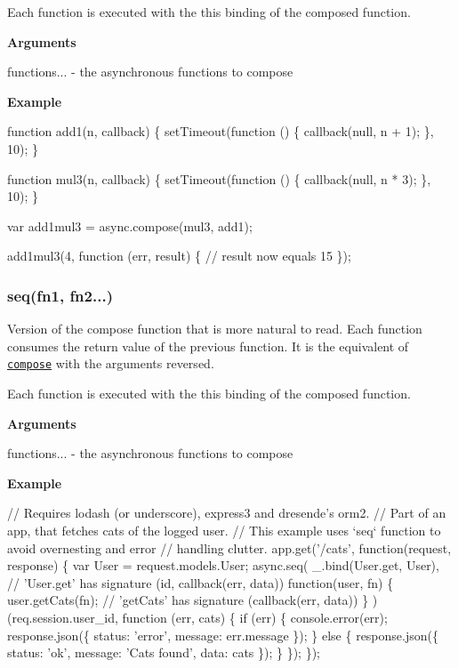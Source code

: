 Each function is executed with the {\ttfamily this} binding of the composed function.

{\bfseries Arguments}


\begin{DoxyItemize}
\item {\ttfamily functions...} -\/ the asynchronous functions to compose
\end{DoxyItemize}

{\bfseries Example}


\begin{DoxyCode}
function add1(n, callback) \{
    setTimeout(function () \{
        callback(null, n + 1);
    \}, 10);
\}

function mul3(n, callback) \{
    setTimeout(function () \{
        callback(null, n * 3);
    \}, 10);
\}

var add1mul3 = async.compose(mul3, add1);

add1mul3(4, function (err, result) \{
   // result now equals 15
\});
\end{DoxyCode}
 

 \label{_seq}%
 \subsubsection*{seq(fn1, fn2...)}

Version of the compose function that is more natural to read. Each function consumes the return value of the previous function. It is the equivalent of \href{#compose}{\tt {\ttfamily compose}} with the arguments reversed.

Each function is executed with the {\ttfamily this} binding of the composed function.

{\bfseries Arguments}


\begin{DoxyItemize}
\item {\ttfamily functions...} -\/ the asynchronous functions to compose
\end{DoxyItemize}

{\bfseries Example}


\begin{DoxyCode}
// Requires lodash (or underscore), express3 and dresende's orm2.
// Part of an app, that fetches cats of the logged user.
// This example uses `seq` function to avoid overnesting and error
// handling clutter.
app.get('/cats', function(request, response) \{
  var User = request.models.User;
  async.seq(
    \_.bind(User.get, User),  // 'User.get' has signature (id, callback(err, data))
    function(user, fn) \{
      user.getCats(fn);      // 'getCats' has signature (callback(err, data))
    \}
  )(req.session.user\_id, function (err, cats) \{
    if (err) \{
      console.error(err);
      response.json(\{ status: 'error', message: err.message \});
    \} else \{
      response.json(\{ status: 'ok', message: 'Cats found', data: cats \});
    \}
  \});
\});
\end{DoxyCode}
 

